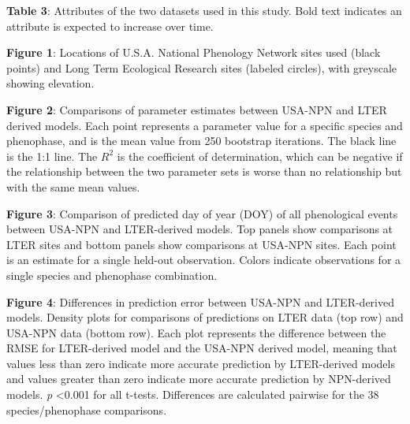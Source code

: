 \documentclass[fleqn,12pt,lineno]{article}
\begin{document}
\textbf{Table 3}: Attributes of the two datasets used in this study. Bold text indicates an attribute is expected to increase over time.



\newpage

\textbf{Figure 1}: Locations of U.S.A. National Phenology Network sites used (black points) and Long Term Ecological Research sites (labeled circles), with greyscale showing elevation.


\newpage

\textbf{Figure 2}: Comparisons of parameter estimates between USA-NPN and LTER derived models. Each point represents a parameter value for a specific species and phenophase, and is the mean value from 250 bootstrap iterations. The black line is the 1:1 line. The $R^2$ is the coefficient of determination, which can be negative if the relationship between the two parameter sets is worse than no relationship but with the same mean values.

\newpage


\newpage

\textbf{Figure 3}: Comparison of predicted day of year (DOY) of all phenological events between USA-NPN and LTER-derived models. Top panels show comparisons at LTER sites and bottom panels show comparisons at USA-NPN sites. Each point is an estimate for a single held-out observation. Colors indicate observations for a single species and phenophase combination.


\newpage

\textbf{Figure 4}: Differences in prediction error between USA-NPN and LTER-derived models. Density plots for comparisons of predictions on LTER data (top row) and USA-NPN data (bottom row). Each plot represents the difference between the RMSE for LTER-derived model and the USA-NPN derived model, meaning that values less than zero indicate more accurate prediction by LTER-derived models and values greater than zero indicate more accurate prediction by NPN-derived models. \textit{p} <0.001 for all t-tests. Differences are calculated pairwise for the 38 species/phenophase comparisons.
\end{document}

